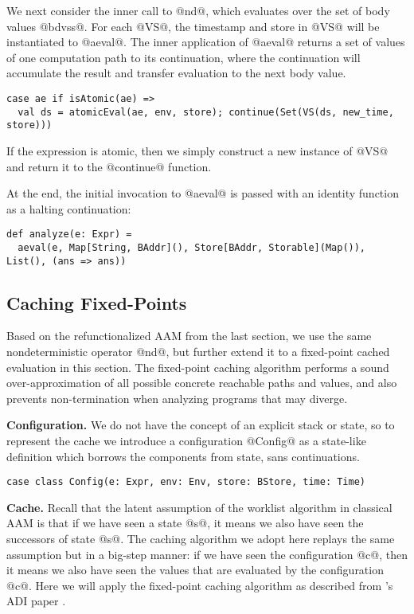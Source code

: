 \documentclass[acmsmall]{acmart}\settopmatter{}
\begin{document}
We next consider the inner call to @nd@, which evaluates over the set of body values @bdvss@.
For each @VS@, the timestamp and store in @VS@ will be instantiated to
@aeval@.
The inner application of @aeval@ returns a set of values of one computation path to its
continuation, where the continuation will accumulate the result and transfer
evaluation to the next body value.

\begin{lstlisting}
case ae if isAtomic(ae) =>
  val ds = atomicEval(ae, env, store); continue(Set(VS(ds, new_time, store)))
\end{lstlisting}

If the expression is atomic, then we simply construct a new instance of
@VS@ and return it to the @continue@ function.

At the end, the initial invocation to @aeval@ is passed with an identity
function as a halting continuation:
\begin{lstlisting}
def analyze(e: Expr) =
  aeval(e, Map[String, BAddr](), Store[BAddr, Storable](Map()), List(), (ans => ans))
\end{lstlisting}

\subsection{Caching Fixed-Points}

Based on the refunctionalized AAM from the last section, we use the same nondeterministic
operator @nd@, but further extend it to a fixed-point cached evaluation in this section.
The fixed-point caching algorithm performs a sound over-approximation of all possible
concrete reachable paths and values, and also prevents non-termination when analyzing 
programs that may diverge.

\textbf{Configuration.}
We do not have the concept of an explicit stack or state,
so to represent the cache we introduce a configuration @Config@ as
a state-like definition which borrows the components from state, sans continuations.
\begin{lstlisting}
case class Config(e: Expr, env: Env, store: BStore, time: Time)
\end{lstlisting}

\textbf{Cache.}
Recall that the latent assumption of the worklist algorithm in classical AAM
is that if we have seen a state @s@, it means we also have seen the successors
of state @s@.
The caching algorithm we adopt here replays the same assumption but in a big-step
manner: if we have seen the configuration @c@, then it means we also have seen
the values that are evaluated by the configuration @c@.
Here we will apply the fixed-point caching algorithm as described from
\citeauthor{darais2017abstracting}'s ADI paper \cite{darais2017abstracting}.
\end{document}
